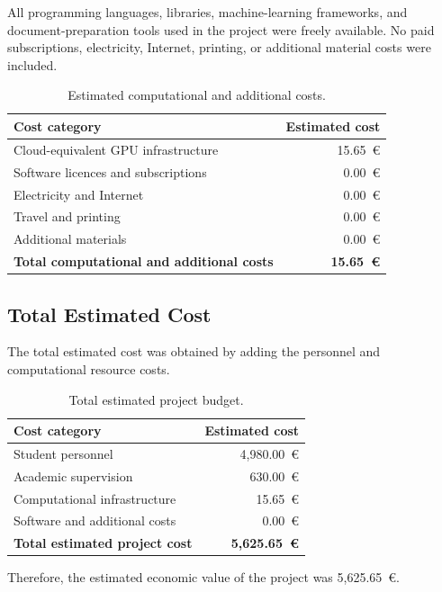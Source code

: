 All programming languages, libraries, machine-learning frameworks, and document-preparation tools used in the project were freely available. No paid subscriptions, electricity, Internet, printing, or additional material costs were included.

\begin{table}[htbp]
    \centering
    \caption{Estimated computational and additional costs.}
    \label{tab:computational_costs}
    \renewcommand{\arraystretch}{1.15}
    \begin{tabular}{lr}
        \toprule
        \textbf{Cost category} & \textbf{Estimated cost} \\
        \midrule
        Cloud-equivalent GPU infrastructure & 15.65~€ \\
        Software licences and subscriptions & 0.00~€ \\
        Electricity and Internet & 0.00~€ \\
        Travel and printing & 0.00~€ \\
        Additional materials & 0.00~€ \\
        \midrule
        \textbf{Total computational and additional costs}
            & \textbf{15.65~€} \\
        \bottomrule
    \end{tabular}
\end{table}

\subsection{Total Estimated Cost}
\label{subsec:total_estimated_cost}

The total estimated cost was obtained by adding the personnel and computational resource costs.

\begin{table}[htbp]
    \centering
    \caption{Total estimated project budget.}
    \label{tab:total_project_budget}
    \renewcommand{\arraystretch}{1.15}
    \begin{tabular}{lr}
        \toprule
        \textbf{Cost category} & \textbf{Estimated cost} \\
        \midrule
        Student personnel & 4,980.00~€ \\
        Academic supervision & 630.00~€ \\
        Computational infrastructure & 15.65~€ \\
        Software and additional costs & 0.00~€ \\
        \midrule
        \textbf{Total estimated project cost}
            & \textbf{5,625.65~€} \\
        \bottomrule
    \end{tabular}
\end{table}

Therefore, the estimated economic value of the project was 5,625.65~€.